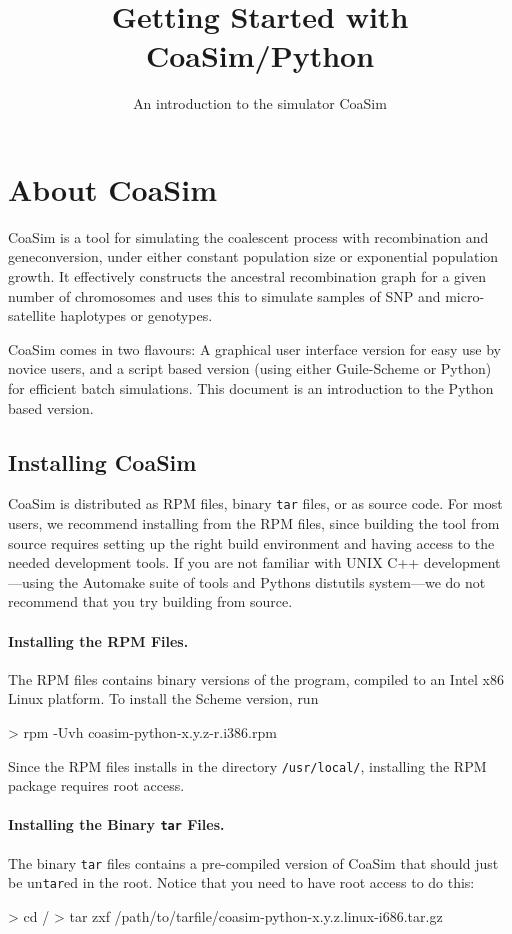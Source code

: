 \documentclass{manual}
\title{Getting Started with CoaSim/Python}
\subtitle{An introduction to the simulator CoaSim}
\begin{document}
\section{About CoaSim}

CoaSim is a tool for simulating the coalescent process with
recombination and geneconversion, under either constant population
size or exponential population growth.  It effectively constructs the
ancestral recombination graph for a given number of chromosomes and
uses this to simulate samples of SNP and micro-satellite haplotypes or
genotypes.

CoaSim comes in two flavours: A graphical user interface version for
easy use by novice users, and a script based version (using either
Guile-Scheme or Python) for efficient batch simulations.  This
document is an introduction to the Python based version.


\subsection{Installing CoaSim}

CoaSim is distributed as RPM files, binary \texttt{tar} files, or as
source code.  For most users, we recommend installing from the RPM
files, since building the tool from source requires setting up the
right build environment and having access to the needed development
tools.  If you are not familiar with UNIX C++ development---using the
Automake suite of tools and Pythons distutils system---we do not
recommend that you try building from source.

\paragraph{Installing the RPM Files.}

The RPM files contains binary versions of the program, compiled to an
Intel x86 Linux platform.  To install the Scheme version, run
\begin{code}
> rpm -Uvh coasim-python-x.y.z-r.i386.rpm
\end{code}
Since the RPM files installs in the directory \verb?/usr/local/?,
installing the RPM package requires root access.

\paragraph{Installing the Binary \texttt{tar} Files.}

The binary \texttt{tar} files contains a pre-compiled version of
CoaSim that should just be un\texttt{tar}ed in the root.  Notice that
you need to have root access to do this:
\begin{code}
> cd /
> tar zxf /path/to/tarfile/coasim-python-x.y.z.linux-i686.tar.gz
\end{code}
\end{document}
